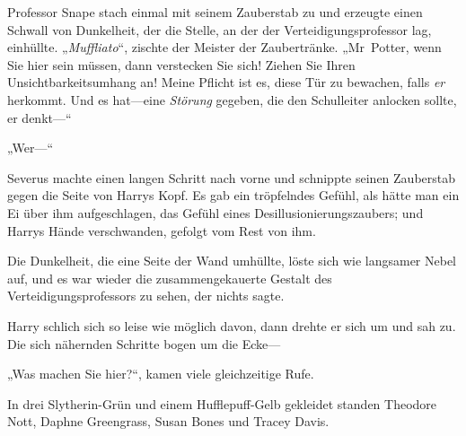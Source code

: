 Professor Snape stach einmal mit seinem Zauberstab zu und erzeugte einen Schwall von Dunkelheit, der die Stelle, an der der Verteidigungsprofessor lag, einhüllte.
„\emph{Muffliato}“, zischte der Meister der Zaubertränke. „Mr~Potter, wenn Sie hier sein müssen, dann verstecken Sie sich! Ziehen Sie Ihren Unsichtbarkeitsumhang an! Meine Pflicht ist es, diese Tür zu bewachen, falls \emph{er} herkommt. Und es hat—eine \emph{Störung} gegeben, die den Schulleiter anlocken sollte, er denkt—“

„Wer—“

Severus machte einen langen Schritt nach vorne und schnippte seinen Zauberstab gegen die Seite von Harrys Kopf. Es gab ein tröpfelndes Gefühl, als hätte man ein Ei über ihm aufgeschlagen, das Gefühl eines Desillusionierungszaubers; und Harrys Hände verschwanden, gefolgt vom Rest von ihm.

Die Dunkelheit, die eine Seite der Wand umhüllte, löste sich wie langsamer Nebel auf, und es war wieder die zusammengekauerte Gestalt des Verteidigungsprofessors zu sehen, der nichts sagte.

Harry schlich sich so leise wie möglich davon, dann drehte er sich um und sah zu.
Die sich nähernden Schritte bogen um die Ecke—

„Was machen Sie hier?“, kamen viele gleichzeitige Rufe.

In drei Slytherin-Grün und einem Hufflepuff-Gelb gekleidet standen Theodore Nott, Daphne Greengrass, Susan Bones und Tracey Davis.

